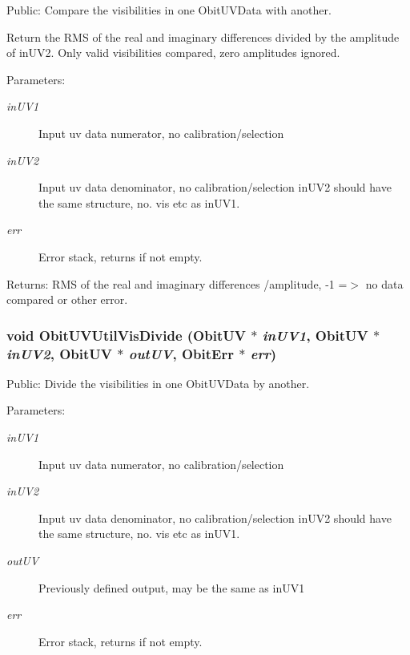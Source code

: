 Public: Compare the visibilities in one Obit\-UVData with another. 

Return the RMS of the real and imaginary differences divided by the amplitude of in\-UV2. Only valid visibilities compared, zero amplitudes ignored. \begin{Desc}
\item[Parameters:]
\begin{description}
\item[{\em in\-UV1}]Input uv data numerator, no calibration/selection \item[{\em in\-UV2}]Input uv data denominator, no calibration/selection in\-UV2 should have the same structure, no. vis etc as in\-UV1. \item[{\em err}]Error stack, returns if not empty. \end{description}
\end{Desc}
\begin{Desc}
\item[Returns:]RMS of the real and imaginary differences /amplitude, -1 =$>$ no data compared or other error. \end{Desc}
\subsubsection{\setlength{\rightskip}{0pt plus 5cm}void Obit\-UVUtil\-Vis\-Divide ({\bf Obit\-UV} $\ast$ {\em in\-UV1}, {\bf Obit\-UV} $\ast$ {\em in\-UV2}, {\bf Obit\-UV} $\ast$ {\em out\-UV}, {\bf Obit\-Err} $\ast$ {\em err})}\label{ObitUVUtil_8c_a6}


Public: Divide the visibilities in one Obit\-UVData by another. 

\begin{Desc}
\item[Parameters:]
\begin{description}
\item[{\em in\-UV1}]Input uv data numerator, no calibration/selection \item[{\em in\-UV2}]Input uv data denominator, no calibration/selection in\-UV2 should have the same structure, no. vis etc as in\-UV1. \item[{\em out\-UV}]Previously defined output, may be the same as in\-UV1 \item[{\em err}]Error stack, returns if not empty. \end{description}
\end{Desc}
